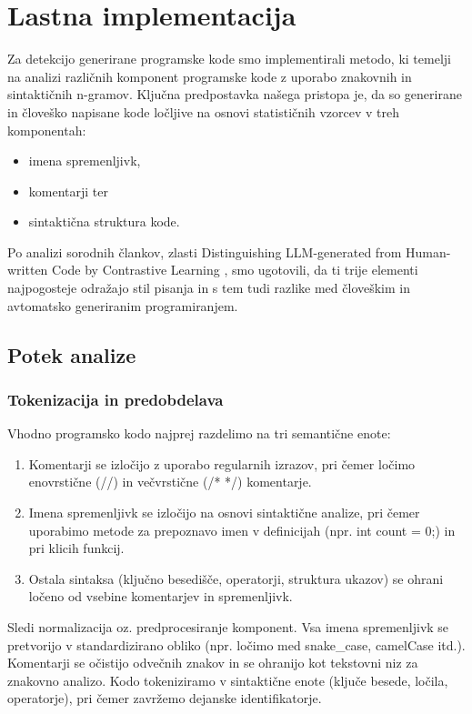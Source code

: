 \documentclass[sigconf,nonacm]{acmart}
\begin{document}
\section{Lastna implementacija}
Za detekcijo generirane programske kode smo implementirali metodo, ki temelji na analizi različnih komponent programske kode z uporabo znakovnih in sintaktičnih n-gramov. Ključna predpostavka našega pristopa je, da so generirane in človeško napisane kode ločljive na osnovi statističnih vzorcev v treh komponentah:
\begin{itemize}
	\item imena spremenljivk,
	\item komentarji ter
	\item sintaktična struktura kode.
\end{itemize}
Po analizi sorodnih člankov, zlasti Distinguishing LLM-generated from Human-written Code by Contrastive Learning \cite{xu2024distinguishing}, smo ugotovili, da ti trije elementi najpogosteje odražajo stil pisanja in s tem tudi razlike med človeškim in avtomatsko generiranim programiranjem.
\subsection{Potek analize}
\subsubsection{Tokenizacija in predobdelava}
Vhodno programsko kodo najprej razdelimo na tri semantične enote:
\begin{enumerate}
	\item Komentarji se izločijo z uporabo regularnih izrazov, pri čemer ločimo enovrstične (//) in večvrstične (/* */) komentarje.
	\item Imena spremenljivk se izločijo na osnovi sintaktične analize, pri čemer uporabimo metode za prepoznavo imen v definicijah (npr. int count = 0;) in pri klicih funkcij.
	\item Ostala sintaksa (ključno besedišče, operatorji, struktura ukazov) se ohrani ločeno od vsebine komentarjev in spremenljivk.
\end{enumerate}
Sledi normalizacija oz. predprocesiranje komponent.
Vsa imena spremenljivk se pretvorijo v standardizirano obliko (npr. ločimo med snake\_case, camelCase itd.).
Komentarji se očistijo odvečnih znakov in se ohranijo kot tekstovni niz za znakovno analizo.
Kodo tokeniziramo v sintaktične enote (ključe besede, ločila, operatorje), pri čemer zavržemo dejanske identifikatorje.
\end{document}
